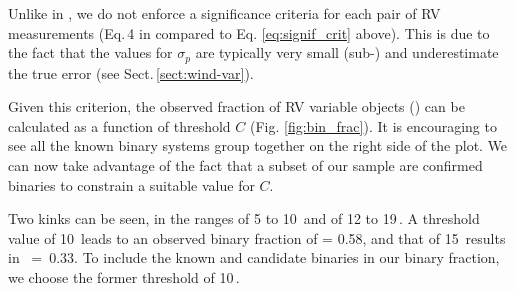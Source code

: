 Unlike in \citet{sana_vlt-flames_2013}, we do not enforce a significance criteria for each pair of RV measurements (Eq.\,4 in \citealt{sana_vlt-flames_2013} compared to Eq. \ref{eq:signif_crit} above). This is due to the fact that the values for $\sigma_p$ are typically very small (sub-\kms{}) and underestimate the true error (see Sect.\,\ref{sect:wind-var}). 

Given this criterion, the observed fraction of RV variable objects (\fobsWC{}) can be calculated as a function of threshold $C$ (Fig. \ref{fig:bin_frac}). It is encouraging to see all the known binary systems group together on the right side of the plot. We can now take advantage of the fact that a subset of our sample are confirmed binaries to constrain a suitable value for $C$.

Two kinks can be seen, in the ranges of 5 to 10\,\kms{} and of 12 to 19\,\kms{}. A threshold value of 10\,\kms{} leads to an observed binary fraction of \fobsWC{} = 0.58, and that of 15\,\kms{} results in \mbox{\fobsWC{} = 0.33}. To include the known and candidate binaries in our binary fraction, we choose the former threshold of 10\,\kms{}. 

